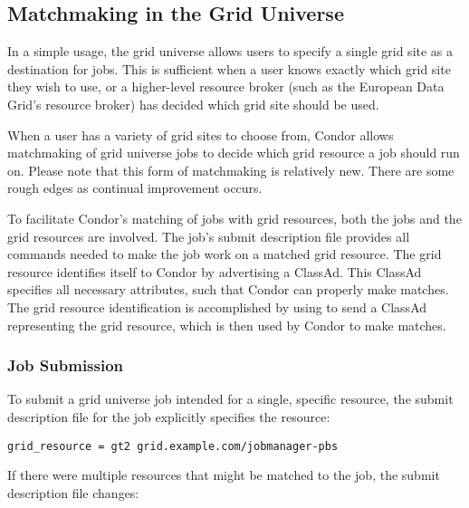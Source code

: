 \subsection{\label{sec:Grid-Matchmaking}Matchmaking in the Grid Universe}

In a simple usage, the grid universe allows users to specify a single
grid site as a destination for jobs.
This is sufficient when a user knows exactly which
grid site they wish to use,
or a higher-level resource broker
(such as the European Data Grid's resource broker)
has decided which grid site should be used.

When a user has a variety of grid sites to choose from,
Condor allows matchmaking of grid universe jobs
to decide which grid resource a job should run on. 
Please note that this form of matchmaking is relatively new.
There are some rough edges as continual improvement occurs.

To facilitate Condor's matching of jobs with grid resources,
both the jobs and the grid resources are involved.
The job's submit description file provides all commands
needed to make the
job work on a matched grid resource.
The grid resource identifies itself to Condor by advertising
a ClassAd.
This ClassAd specifies all necessary attributes, such that Condor
can properly make matches.
The grid resource identification is accomplished by 
using  to send a ClassAd representing the
grid resource, which is then used by Condor to make matches.

\subsubsection{Job Submission}

To submit a grid universe job intended for a single, specific
 resource,
the submit description file for the job explicitly specifies
the resource:

\footnotesize
\begin{verbatim}
grid_resource = gt2 grid.example.com/jobmanager-pbs
\end{verbatim}
\normalsize

If there were multiple  resources that
might be matched to the job,
the submit description file changes:

